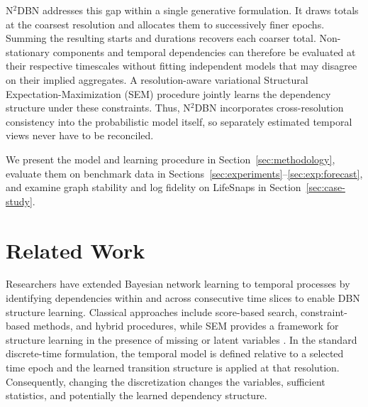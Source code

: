 \documentclass[sigconf]{acmart}
\begin{document}
N$^2$DBN addresses this gap within a single generative formulation. It draws totals at the coarsest resolution and allocates them to successively finer epochs. Summing the resulting starts and durations recovers each coarser total. Non-stationary components and temporal dependencies can therefore be evaluated at their respective timescales without fitting independent models that may disagree on their implied aggregates. A resolution-aware variational Structural Expectation-Maximization (SEM) procedure jointly learns the dependency structure under these constraints. Thus, N$^2$DBN incorporates cross-resolution consistency into the probabilistic model itself, so separately estimated temporal views never have to be reconciled.

We present the model and learning procedure in Section~\ref{sec:methodology}, evaluate them on benchmark data in Sections~\ref{sec:experiments}--\ref{sec:exp:forecast}, and examine graph stability and log fidelity on LifeSnaps in Section~\ref{sec:case-study}.

\section{Related Work}
\label{sec:related-work}

Researchers have extended Bayesian network learning to temporal processes by identifying dependencies within and across consecutive time slices to enable DBN structure learning. Classical approaches include score-based search, constraint-based methods, and hybrid procedures, while SEM provides a framework for structure learning in the presence of missing or latent variables \citep{murphy_2002_dbn,kitson_survey_2023,kungurtsev_learning_2025}. In the standard discrete-time formulation, the temporal model is defined relative to a selected time epoch and the learned transition structure is applied at that resolution. Consequently, changing the discretization changes the variables, sufficient statistics, and potentially the learned dependency structure.
\end{document}
